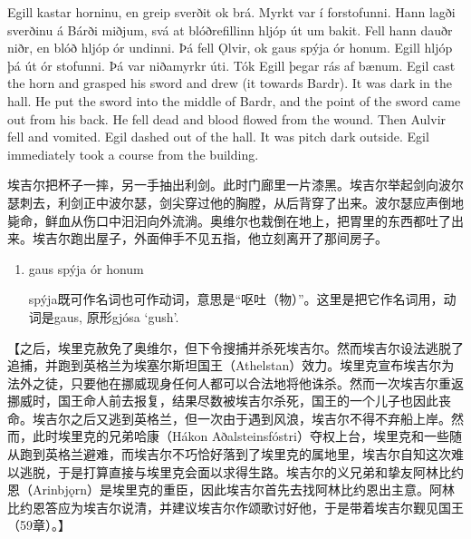 \begin{paracol}{2}
  Egill kastar horninu, en greip sverðit ok brá. Myrkt var í forstofunni. Hann lagði sverðinu á Bárði miðjum, svá at blóðrefillinn hljóp út um bakit. Fell hann dauðr niðr, en blóð hljóp ór undinni. Þá fell Ǫlvir, ok gaus spýja ór honum. Egill hljóp þá út ór stofunni. Þá var niðamyrkr úti. Tók Egill þegar rás af bænum.
  \switchcolumn
  Egil cast the horn and grasped his sword and drew (it towards Bardr). It was dark in the hall. He put the sword into the middle of Bardr, and the point of the sword came out from his back. He fell dead and blood flowed from the wound. Then Aulvir fell and vomited. Egil dashed out of the hall. It was pitch dark outside. Egil immediately took a course from the building.
\end{paracol}
\begin{translation*}{}
  埃吉尔把杯子一摔，另一手抽出利剑。此时门廊里一片漆黑。埃吉尔举起剑向波尔瑟刺去，利剑正中波尔瑟，剑尖穿过他的胸膛，从后背穿了出来。波尔瑟应声倒地毙命，鲜血从伤口中汩汩向外流淌。奥维尔也栽倒在地上，把胃里的东西都吐了出来。埃吉尔跑出屋子，外面伸手不见五指，他立刻离开了那间房子。
\end{translation*}
\begin{grammar*}{}
  \begin{enumerate}[leftmargin=*]
    \item gaus spýja ór honum

          spýja既可作名词也可作动词，意思是“呕吐（物）”。这里是把它作名词用，动词是gaus, 原形gjósa `gush'.
  \end{enumerate}
\end{grammar*}
\medskip
【之后，埃里克赦免了奥维尔，但下令搜捕并杀死埃吉尔。然而埃吉尔设法逃脱了追捕，并跑到英格兰为埃塞尔斯坦国王（Athelstan）效力。埃里克宣布埃吉尔为法外之徒，只要他在挪威现身任何人都可以合法地将他诛杀。然而一次埃吉尔重返挪威时，国王命人前去报复，结果尽数被埃吉尔杀死，国王的一个儿子也因此丧命。埃吉尔之后又逃到英格兰，但一次由于遇到风浪，埃吉尔不得不弃船上岸。然而，此时埃里克的兄弟哈康（Hákon Aðalsteinsfóstri）夺权上台，埃里克和一些随从跑到英格兰避难，而埃吉尔不巧恰好落到了埃里克的属地里，埃吉尔自知这次难以逃脱，于是打算直接与埃里克会面以求得生路。埃吉尔的义兄弟和挚友阿林比约恩（Arinbjǫrn）是埃里克的重臣，因此埃吉尔首先去找阿林比约恩出主意。阿林比约恩答应为埃吉尔说清，并建议埃吉尔作颂歌讨好他，于是带着埃吉尔觐见国王（59章）。】
\medskip
